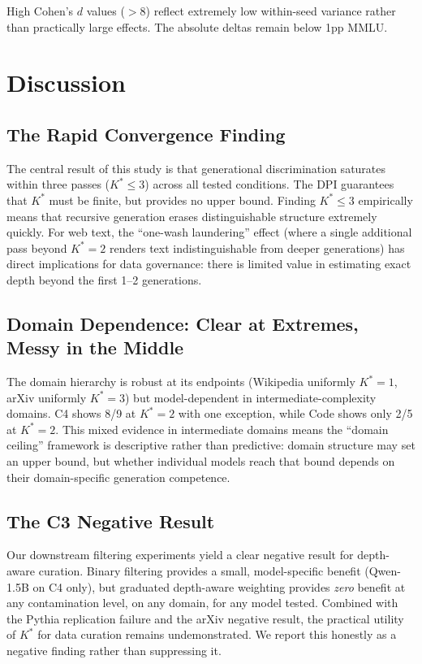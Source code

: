\documentclass[11pt]{article}
\newcommand{\kstar}{K^*}
\begin{document}
High Cohen's $d$ values ($>8$) reflect extremely low within-seed variance rather than practically large effects. The absolute deltas remain below 1pp MMLU.


\section{Discussion}
\label{sec:discussion}

\subsection{The Rapid Convergence Finding}

The central result of this study is that generational discrimination saturates within three passes ($\kstar \leq 3$) across all tested conditions. The DPI guarantees that $\kstar$ must be finite, but provides no upper bound. Finding $\kstar \leq 3$ empirically means that recursive generation erases distinguishable structure extremely quickly. For web text, the ``one-wash laundering'' effect (where a single additional pass beyond $\kstar{=}2$ renders text indistinguishable from deeper generations) has direct implications for data governance: there is limited value in estimating exact depth beyond the first 1--2 generations.

\subsection{Domain Dependence: Clear at Extremes, Messy in the Middle}

The domain hierarchy is robust at its endpoints (Wikipedia uniformly $\kstar{=}1$, arXiv uniformly $\kstar{=}3$) but model-dependent in intermediate-complexity domains. C4 shows 8/9 at $\kstar{=}2$ with one exception, while Code shows only 2/5 at $\kstar{=}2$. This mixed evidence in intermediate domains means the ``domain ceiling'' framework is descriptive rather than predictive: domain structure may set an upper bound, but whether individual models reach that bound depends on their domain-specific generation competence.

\subsection{The C3 Negative Result}

Our downstream filtering experiments yield a clear negative result for depth-aware curation. Binary filtering provides a small, model-specific benefit (Qwen-1.5B on C4 only), but graduated depth-aware weighting provides \emph{zero} benefit at any contamination level, on any domain, for any model tested. Combined with the Pythia replication failure and the arXiv negative result, the practical utility of $\kstar$ for data curation remains undemonstrated. We report this honestly as a negative finding rather than suppressing it.
\end{document}
